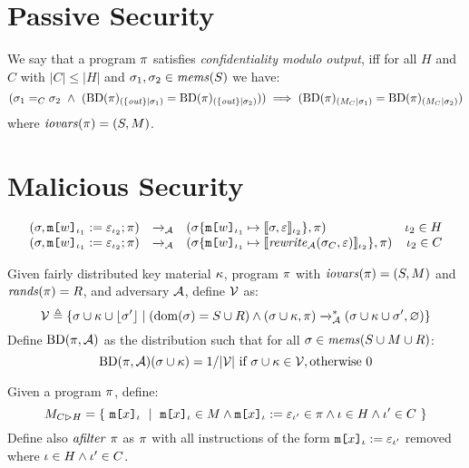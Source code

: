 \section{Passive Security}

\begin{definition}
  \label{definition-NIMO}
  We say that a program  $\pi$ satisfies \emph{confidentiality modulo output},
  iff for all $H$ and $C$ with $|C|\le|H|$ and 
  $\sigma_1,\sigma_2 \in \mathit{mems}(S)$ we have:
  $$
  (\store_1 =_C \store_2 \ \wedge \ 
  (\condd{\progtt(\prog)}{\{ \outv \}}{\store_1} = \condd{\progtt(\prog)}{\{ \outv \}}{\store_2}))
  \implies 
  (\condd{\progtt(\prog)}{M_C}{\store_1} = \condd{\progtt(\prog)}{M_C}{\store_2})
  $$
  where $\mathit{iovars}(\pi) = (S,M)$.
\end{definition}

\section{Malicious Security}

$$
\begin{array}{rclr}
  (\sigma, \texttt{m[}w\texttt{]}_{\iota_1} := \varepsilon_{\iota_2};\pi) &\xrightarrow{}_{\mathcal{A}}&
  (\sigma\{\texttt{m[}w\texttt{]}_{\iota_1} \mapsto \llbracket \sigma,\varepsilon \rrbracket_{\iota_2}\}, \pi) & \iota_2 \in H\\
  (\sigma, \texttt{m[}w\texttt{]}_{\iota_1} := \varepsilon_{\iota_2};\pi) &\xrightarrow{}_{\mathcal{A}}&
  (\sigma\{\texttt{m[}w\texttt{]}_{\iota_1} \mapsto \llbracket \mathit{rewrite}_{\mathcal{A}}(\sigma_C,\varepsilon) \rrbracket_{\iota_2}\}, \pi) & \iota_2 \in C
\end{array}
$$

\begin{definition}
  \label{def-progtt}
  \label{definition-progtt}
  Given fairly distributed key material $\kappa$, program $\pi$ with $\mathit{iovars}(\pi) = (S,M)$ and $\mathit{rands}(\pi) = R$,
  and adversary $\mathcal{A}$, define $\mathcal{V}$ as:
  $$
  \mathcal{V} \triangleq \{ \sigma \cup \kappa \cup \lfloor \sigma' \rfloor \mid (\mathrm{dom}(\sigma) = S \cup R) \wedge (\sigma \cup \kappa,\pi) \xrightarrow{}^{*}_{\mathcal{A}}
  (\sigma \cup \kappa \cup \sigma',\varnothing) \}
  $$
  Define $\mathrm{BD}(\pi, \mathcal{A})$ as the distribution such that for all
  $\sigma \in \mathit{mems}(S \cup M \cup R)$:
  $$
  \progtt(\prog,\adversary)(\store \cup \kmat) =  1 / |\views| \ \text{if}\ \store \cup \kmat \in \views, \text{otherwise}\ 0
  $$
\end{definition}

\begin{definition}
  Given a program $\pi$, define:
  $$
  \cinputs = \{\ \elab{\mesg{x}}{\cid}\ \mid\  \elab{\mesg{x}}{\cid} \in M \wedge \eassign{\mesg{x}}{\cid}{\be}{\cid'} \in \prog
  \wedge \cid \in H \wedge \cid' \in C \ \} 
  $$
  Define also $\mathit{afilter}\ \pi$ as $\pi$ with all instructions of the form $\texttt{m[}x\texttt{]}_{\iota} := \varepsilon_{\iota'}$ removed
  where $\iota \in H \wedge \iota' \in C$.
\end{definition}

